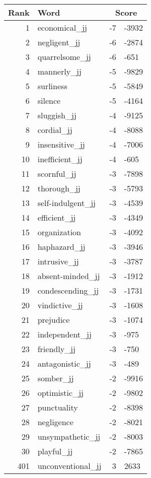 \begin{longtable}[!htbp]{| rlr@{.}l |}
    \hline
    \textbf{Rank} & \textbf{Word} & \multicolumn{2}{c|}{\textbf{Score}} \\
    \hline
    \endhead
    1 & economical\_jj & -7 & -3932 \\
    2 & negligent\_jj & -6 & -2874 \\
    3 & quarrelsome\_jj & -6 & -651 \\
    4 & mannerly\_jj & -5 & -9829 \\
    5 & surliness & -5 & -5849 \\
    6 & silence & -5 & -4164 \\
    7 & sluggish\_jj & -4 & -9125 \\
    8 & cordial\_jj & -4 & -8088 \\
    9 & insensitive\_jj & -4 & -7006 \\
    10 & inefficient\_jj & -4 & -605 \\
    11 & scornful\_jj & -3 & -7898 \\
    12 & thorough\_jj & -3 & -5793 \\
    13 & self-indulgent\_jj & -3 & -4539 \\
    14 & efficient\_jj & -3 & -4349 \\
    15 & organization & -3 & -4092 \\
    16 & haphazard\_jj & -3 & -3946 \\
    17 & intrusive\_jj & -3 & -3787 \\
    18 & absent-minded\_jj & -3 & -1912 \\
    19 & condescending\_jj & -3 & -1731 \\
    20 & vindictive\_jj & -3 & -1608 \\
    21 & prejudice & -3 & -1074 \\
    22 & independent\_jj & -3 & -975 \\
    23 & friendly\_jj & -3 & -750 \\
    24 & antagonistic\_jj & -3 & -489 \\
    25 & somber\_jj & -2 & -9916 \\
    26 & optimistic\_jj & -2 & -9802 \\
    27 & punctuality & -2 & -8398 \\
    28 & negligence & -2 & -8021 \\
    29 & unsympathetic\_jj & -2 & -8003 \\
    30 & playful\_jj & -2 & -7865 \\
    401 & unconventional\_jj & 3 & 2633 \\

\end{longtable}
